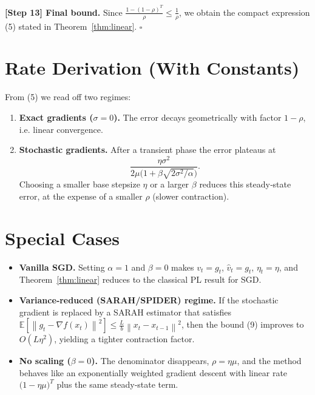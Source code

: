 \documentclass{article}
\newcommand{\E}{\mathbb{E}}
\newcommand{\norm}[1]{\left\lVert #1\right\rVert}
\begin{document}
\noindent\textbf{[Step 13] Final bound.}  
Since $\frac{1-(1-\rho)^T}{\rho}\le\frac{1}{\rho}$, we obtain the compact expression (5) stated in Theorem~\ref{thm:linear}. \hfill $\square$

\section*{Rate Derivation (With Constants)}
From (5) we read off two regimes:

\begin{enumerate}
\item \textbf{Exact gradients ($\sigma=0$).} The error decays geometrically with factor $1-\rho$, i.e. linear convergence.
\item \textbf{Stochastic gradients.} After a transient phase the error plateaus at
\[
\frac{\eta\sigma^2}{2\mu\bigl(1+\beta\sqrt{2\sigma^2/\alpha}\bigr)} .
\]
Choosing a smaller base stepsize $\eta$ or a larger $\beta$ reduces this steady‑state error, at the expense of a smaller $\rho$ (slower contraction).
\end{enumerate}

\section*{Special Cases}
\begin{itemize}
\item \textbf{Vanilla SGD.} Setting $\alpha=1$ and $\beta=0$ makes $v_t=g_t$, $\hat v_t=g_t$, $\eta_t=\eta$, and Theorem~\ref{thm:linear} reduces to the classical PL result for SGD.
\item \textbf{Variance‑reduced (SARAH/SPIDER) regime.} If the stochastic gradient is replaced by a SARAH estimator that satisfies $\E[\norm{g_t-\nabla f(x_t)}^2]\le \frac{L}{b}\norm{x_t-x_{t-1}}^2$, then the bound (9) improves to $O(L\eta^2)$, yielding a tighter contraction factor.
\item \textbf{No scaling ($\beta=0$).} The denominator disappears, $\rho=\eta\mu$, and the method behaves like an exponentially weighted gradient descent with linear rate $\bigl(1-\eta\mu\bigr)^T$ plus the same steady‑state term.
\end{itemize}
\end{document}
